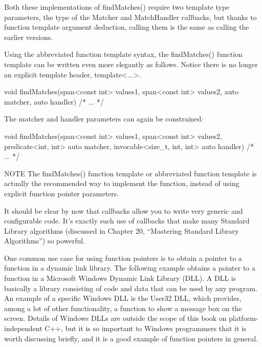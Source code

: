 Both these implementations of findMatches() require two template type parameters, the type of the Matcher and MatchHandler callbacks, but thanks to function template argument deduction, calling them is the same as calling the earlier versions.

Using the abbreviated function template syntax, the findMatches() function template can be written even more elegantly as follows. Notice there is no longer an explicit template header, template<...>.

\begin{cpp}
void findMatches(span<const int> values1, span<const int> values2,
    auto matcher, auto handler)
{ /* ... */ }
\end{cpp}

The matcher and handler parameters can again be constrained:

\begin{cpp}
void findMatches(span<const int> values1, span<const int> values2,
    predicate<int, int> auto matcher, invocable<size_t, int, int> auto handler)
{ /* ... */ }
\end{cpp}

\begin{myNotic}{NOTE}
The findMatches() function template or abbreviated function template is actually the recommended way to implement the function, instead of using explicit function pointer parameters.
\end{myNotic}

It should be clear by now that callbacks allow you to write very generic and configurable code. It’s exactly such use of callbacks that make many Standard Library algorithms (discussed in Chapter 20, “Mastering Standard Library Algorithms”) so powerful.


One common use case for using function pointers is to obtain a pointer to a function in a dynamic link library. The following example obtains a pointer to a function in a Microsoft Windows Dynamic Link Library (DLL). A DLL is basically a library consisting of code and data that can be used by any program. An example of a specific Windows DLL is the User32 DLL, which provides, among a lot of other functionality, a function to show a message box on the screen. Details of Windows DLLs are outside the scope of this book on platform-independent C++, but it is so important to Windows programmers that it is worth discussing briefly, and it is a good example of function pointers in general.

